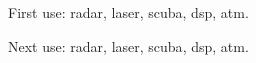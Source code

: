\documentclass{article}
\begin{document}
First use: \gls{radar}, \gls{laser}, \gls{scuba}, \gls{dsp},
\gls{atm}.

Next use: \gls{radar}, \gls{laser}, \gls{scuba}, \gls{dsp},
\gls{atm}.

\printglossaries
\end{document}
